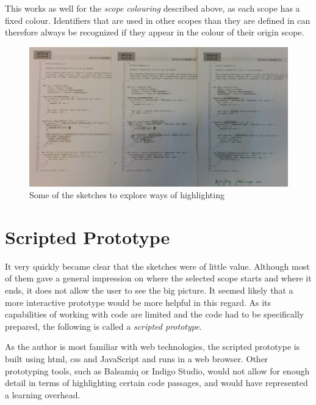 This works as well for the \emph{scope colouring} described above, as
each scope has a fixed colour. Identifiers that are used in other scopes
than they are defined in can therefore always be recognized if they
appear in the colour of their origin scope.

\begin{figure}[htbp]
\centering
\includegraphics[keepaspectratio,width=\textwidth]{img/sketch_highlighting.jpeg}
\caption{Some of the sketches to explore ways of highlighting}
\label{fig:sketches2}
\end{figure}

\section{Scripted Prototype}\label{scripted-prototype}

It very quickly became clear that the sketches were of little value.
Although most of them gave a general impression on where the selected
scope starts and where it ends, it does not allow the user to see the
big picture. It seemed likely that a more interactive prototype would be
more helpful in this regard. As its capabilities of working with code
are limited and the code had to be specifically prepared, the following
is called a \emph{scripted prototype}.

As the author is most familiar with web technologies, the scripted
prototype is built using \ac{html}, \ac{css} and JavaScript and runs in
a web browser. Other prototyping tools, such as Balsamiq or Indigo
Studio, would not allow for enough detail in terms of highlighting
certain code passages, and would have represented a learning overhead.

